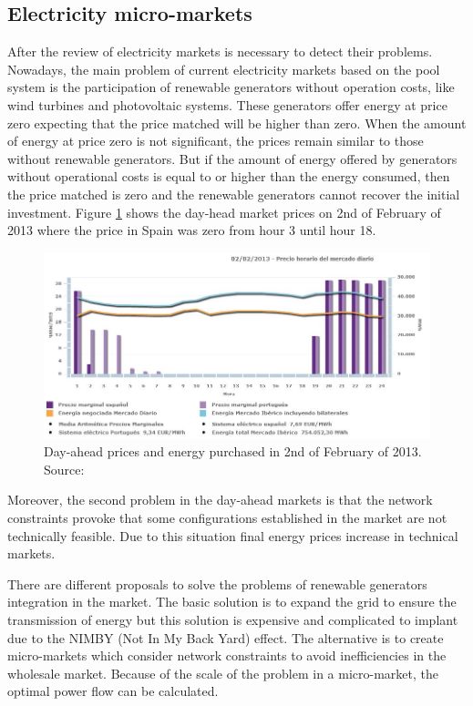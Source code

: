 \documentclass[a4paper,11pt,twoside,openright]{report}
\begin{document}
\subsection{Electricity micro-markets}
\label{sec:SoA_mm}
After the review of electricity markets is necessary to detect their problems. 
Nowadays, the main problem of current electricity markets based on the pool system is the participation of renewable generators without operation costs, like wind turbines and photovoltaic systems.
These generators offer energy at price zero expecting that the price matched will be higher than zero. When the amount of energy at price zero is not significant, the prices remain similar to those without renewable generators. But if the amount of energy offered by generators without operational costs is equal to or higher than the energy consumed, then the price matched is zero and the renewable generators cannot recover the initial investment. Figure \ref{fig:OMIE_02022013} shows the day-head market prices on 2nd of February of 2013 where the price in Spain was zero from hour 3 until hour 18.

\begin{figure}[h!]
	\centering
	\includegraphics[scale=0.6]{Figures/Captura_mercat_diari_febrer2013}
	\caption{Day-ahead prices and energy purchased in 2nd of February of 2013. Source: \cite{OMIE_02022013}}
	\label{fig:OMIE_02022013}
\end{figure}

Moreover, the second problem in the day-ahead markets is that the network constraints provoke that some configurations established in the market are not technically feasible. Due to this situation final energy prices increase in technical markets. 

There are different proposals to solve the problems of renewable generators integration in the market. The basic solution is to expand the grid to ensure the transmission of energy but this solution is expensive and complicated to implant due to the NIMBY (Not In My Back Yard) effect. The alternative is to create micro-markets which consider network constraints to avoid inefficiencies in the wholesale market. Because of the scale of the problem in a micro-market, the optimal power flow can be calculated.
\end{document}
